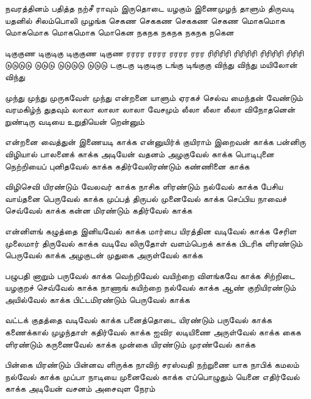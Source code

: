 \begin{flushleft}
{        நவரத்தினம் பதித்த நற்சீ ராவும்
        இருதொடை யழகும் இணைமுழந் தாளும்
        திருவடி யதனில் சிலம்பொலி முழங்க
        செகண செககண செககண செகண
        மொகமொக மொகமொக மொகமொக மொகென
        நகநக நகநக நகநக நகென
                                        
        டிகுகுண டிகுடிகு டிகுகுண டிகுண
        ரரரர ரரரர ரரரர ரரர
        ரிரிரிரி ரிரிரிரி ரிரிரிரி ரிரிரி
        டுடுடுடு டுடுடு டுடுடுடு டுடுடு
        டகுடகு டிகுடிகு டங்கு டிங்குகு
        விந்து விந்து மயிலோன் விந்து
                                        
        முந்து முந்து முருகவேள் முந்து
        என்றனை யாளும் ஏரகச் செல்வ
        மைந்தன் வேண்டும் வரமகிழ்ந் துதவும்
        லாலா லாலா லாலா வேசமும்
        லீலா லீலா லீலா விநோதனென்
        றுண்டிரு வடியை உறுதியென் றென்னும்
                                        
        என்றனை வைத்துன் இணையடி காக்க
        என்னுயிர்க் குயிராம் இறைவன் காக்க
        பன்னிரு விழியால் பாலனைக் காக்க
        அடியேன் வதனம் அழகுவேல் காக்க
        பொடிபுனை நெற்றியைப் புனிதவேல் காக்க
        கதிர்வேலிரண்டும் கண்ணினை காக்க
                                        
        விழிசெவி யிரண்டும் வேலவர் காக்க
        நாசிக ளிரண்டும் நல்வேல் காக்க
        பேசிய வாய்தனை பெருவேல் காக்க
        முப்பத் திருபல் முனைவேல் காக்க
        செப்பிய நாவைச் செவ்வேல் காக்க
        கன்ன மிரண்டும் கதிர்வேல் காக்க
                                        
        என்னிளங் கழுத்தை இனியவேல் காக்க
        மார்பை யிரத்தின வடிவேல் காக்க
        சேரிள முலைமார் திருவேல் காக்க
        வடிவே லிருதோள் வளம்பெறக் காக்க
        பிடரிக ளிரண்டும் பெருவேல் காக்க
        அழகுடன் முதுகை அருள்வேல் காக்க
                                        
        பழுபதி னாறும் பருவேல் காக்க
        வெற்றிவேல் வயிற்றை விளங்கவே காக்க
        சிற்றிடை யழகுறச் செவ்வேல் காக்க
        நாணாங் கயிற்றை நல்வேல் காக்க
        ஆண் குறியிரண்டும் அயில்வேல் காக்க
        பிட்டமிரண்டும் பெருவேல் காக்க
                                        
        வட்டக் குதத்தை வடிவேல் காக்க
        பனைத்தொடை யிரண்டும் பருவேல் காக்க
        கணைக்கால் முழந்தாள் கதிர்வேல் காக்க
        ஐவிர லடியிணை அருள்வேல் காக்க
        கைக ளிரண்டும் கருணைவேல் காக்க
        முன்கை யிரண்டும் முரண்வேல் காக்க
                                        
        பின்கை யிரண்டும் பின்னவ ளிருக்க
        நாவிற் சரஸ்வதி நற்றுணை யாக
        நாபிக் கமலம் நல்வேல் காக்க
        முப்பா நாடியை முனைவேல் காக்க
        எப்பொழுதும் யெனை எதிர்வேல் காக்க
        அடியேன் வசனம் அசைவுள நேரம்
                                        
}
\end{flushleft}
